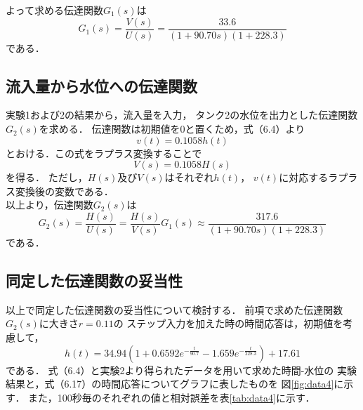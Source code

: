 \documentclass[11pt,a4paper]{jsarticle}
\begin{document}
    よって求める伝達関数$G_1(s)$は
    \begin{equation}
      G_1(s) = \frac{V(s)}{U(s)} = \frac{33.6}{(1 + 90.70 s)(1 + 228.3)}
    \end{equation}
    である．\\

  \subsection{流入量から水位への伝達関数}
    実験1および2の結果から，流入量を入力，
    タンク2の水位を出力とした伝達関数$G_2(s)$を求める．
    伝達関数は初期値を0と置くため，式（6.4）より
    \begin{equation}
      v(t) = 0.1058 h(t)
    \end{equation}
    とおける．この式をラプラス変換することで
    \begin{equation}
      V(s) = 0.1058 H(s)
    \end{equation}
    を得る．
    ただし，$H(s)$及び$V(s)$はそれぞれ$h(t)$，
    $v(t)$に対応するラプラス変換後の変数である．\\
    以上より，伝達関数$G_2(s)$は
    \begin{equation}
      G_2(s) = \frac{H(s)}{U(s)} = \frac{H(s)}{V(s)} G_1(s)
             \approx \frac{317.6}{(1 + 90.70 s)(1 + 228.3)}
    \end{equation}
    である．

  \subsection{同定した伝達関数の妥当性}
    以上で同定した伝達関数の妥当性について検討する．
    前項で求めた伝達関数$G_2(s)$に大きさ$r = 0.11$の
    ステップ入力を加えた時の時間応答は，初期値を考慮して，
    \begin{equation}
      h(t) = 34.94 (1 + 0.6592 e^{- \frac{t}{90.7}} - 1.659 e^{- \frac{t}{228.3}}) + 17.61
    \end{equation}
    である．
    式（6.4）と実験2より得られたデータを用いて求めた時間-水位の
    実験結果と，式（6.17）の時間応答についてグラフに表したものを
    図\ref{fig:data4}に示す．
    また，100秒毎のそれぞれの値と相対誤差を表\ref{tab:data4}に示す．\\
\end{document}
